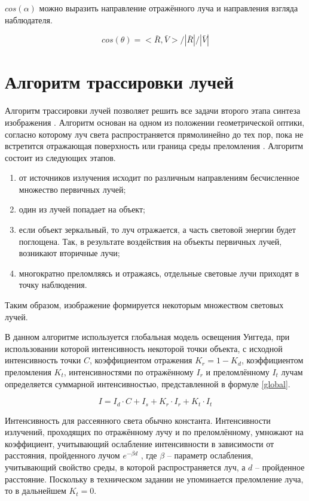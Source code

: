 $cos{(\alpha)}$ можно выразить направление отражённого луча и направления взгляда наблюдателя.

\begin{equation}
	\label{theta}
	cos(\theta) = <\bar{R}, \bar{V}> / |\bar{R}| / |\bar{V}|
\end{equation}

\section{Алгоритм трассировки лучей}

Алгоритм трассировки лучей позволяет решить все задачи второго этапа синтеза изображения \cite{kgmmgtu}. 
Алгоритм основан на одном из положении геометрической оптики, согласно которому луч света распространяется прямолинейно до тех пор, пока не встретится отражающая поверхность или граница среды преломления \cite{kgmmgtu}. 
Алгоритм состоит из следующих этапов.
\begin{enumerate}
	\item от источников излучения исходит по различным направлениям бесчисленное множество первичных лучей;
	\item один из лучей попадает на объект; 
	\item если объект зеркальный, то луч отражается, а часть световой энергии будет поглощена.
	Так, в результате воздействия на объекты первичных лучей, возникают вторичные лучи;
	\item многократно преломляясь и отражаясь, отдельные световые лучи приходят в точку наблюдения. 
\end{enumerate}

Таким образом, изображение формируется некоторым множеством световых лучей.

В данном алгоритме используется \cite{kgtomsk} глобальная модель освещения Уиггеда, при использовании которой интенсивность некоторой точки объекта, с исходной интенсивность точки $C$, коэффициентом отражения $K_r = 1 - K_d$, коэффициентом преломления $K_t$, интенсивностями по отражённому $I_r$ и преломлённому $I_t$ лучам определяется суммарной интенсивностью, представленной в формуле \ref{global}.

\begin{equation}
	\label{global}
	I = I_d \cdot C + I_s + K_r \cdot I_r  + K_t \cdot I_t
\end{equation}

Интенсивность для рассеянного света обычно константа. 
Интенсивности излучений, проходящих по отражённому лучу и по преломлённому, умножают на коэффициент, учитывающий ослабление интенсивности в зависимости от расстояния, пройденного лучом $e^{-\beta d}$ , где $\beta$ – параметр ослабления, учитывающий свойство среды, в которой распространяется луч, а $d$ – пройденное расстояние. 
Поскольку в техническом задании не упоминается преломление луча, то в дальнейшем $K_t  = 0$.


